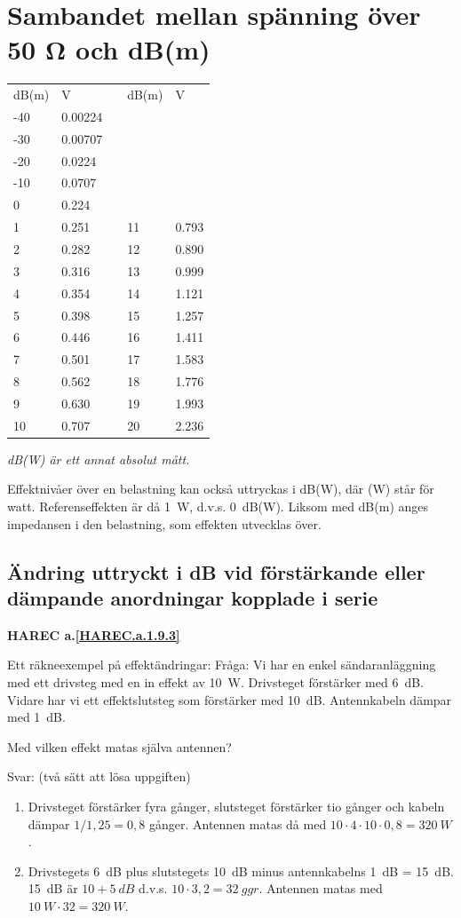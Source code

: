 \section{Sambandet mellan spänning över 50 Ω och dB(m)}
\begin{tabular}{l|lp{1cm}l|l}
	dB(m) & V & & dB(m) & V \\
	\cline{1-2} \cline{4-5}
	-40 & 0.00224 & & & \\
	-30 & 0.00707 & & & \\
	-20 & 0.0224  & & & \\
	-10 & 0.0707  & & & \\
	0   & 0.224   & & & \\
	1   & 0.251   & & 11 & 0.793 \\
	2   & 0.282   & & 12 & 0.890 \\
	3   & 0.316   & & 13 & 0.999 \\
	4   & 0.354   & & 14 & 1.121 \\
	5   & 0.398   & & 15 & 1.257 \\
	6   & 0.446   & & 16 & 1.411 \\
	7   & 0.501   & & 17 & 1.583 \\
	8   & 0.562   & & 18 & 1.776 \\
	9   & 0.630   & & 19 & 1.993 \\
	10  & 0.707   & & 20 & 2.236 \\
\end{tabular}

\emph{dB(W) är ett annat absolut mått.}

Effektnivåer över en belastning kan också uttryckas i dB(W), där (W)
står för watt.  Referenseffekten är då 1~W, d.v.s. 0~dB(W).  Liksom med
dB(m) anges impedansen i den belastning, som effekten utvecklas över.

\subsection{Ändring uttryckt i dB vid förstärkande eller dämpande anordningar kopplade i serie}
\textbf{HAREC a.\ref{HAREC.a.1.9.3}\label{myHAREC.a.1.9.3}}

Ett räkneexempel på effektändringar:
Fråga:
Vi har en enkel sändaranläggning med ett drivsteg med en in effekt av 10~W.
Drivsteget förstärker med 6~dB. Vidare har vi ett effektslutsteg som förstärker
med 10~dB. Antennkabeln dämpar med 1~dB.

Med vilken effekt matas själva antennen?

Svar: (två sätt att lösa uppgiften)
\begin{enumerate}
\item Drivsteget förstärker fyra gånger, slutsteget förstärker tio gånger och
kabeln dämpar \(1/1,25 = 0,8\) gånger. Antennen matas då med
\(10 \cdot 4 \cdot 10 \cdot 0,8 = 320\ W\).
\item Drivstegets 6~dB plus slutstegets 10~dB minus antennkabelns 1~dB = 15~dB.
15~dB är \(10 + 5\ dB\) d.v.s. \(10 \cdot 3,2 = 32\ ggr\). Antennen matas med
\(10\ W \cdot 32 = 320\ W\).
\end{enumerate}

